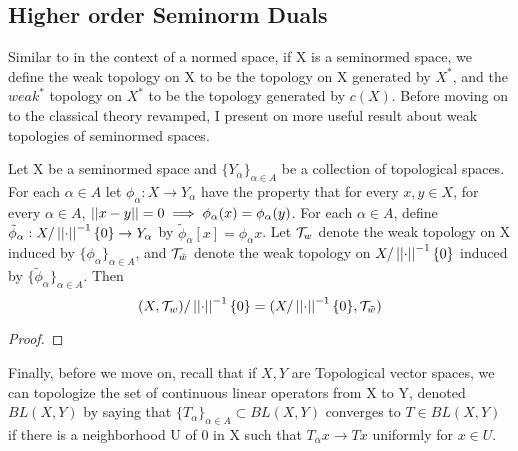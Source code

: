 \subsection{Higher order Seminorm Duals}





 Similar to in the context of a normed space, if X is a seminormed space, we define the weak topology on X to be the topology on X generated by $X^*$, and the $weak^*$ topology on $X^*$ to be the topology generated by $c(X)$.
Before moving on to the classical theory revamped, I present on more useful result about weak topologies of seminormed spaces. 
\begin{prop}
    \label{prop:weakquotients}
    Let X be a seminormed space and $\{Y_\alpha\}_{\alpha \in A}$ be a collection of topological spaces. For each $\alpha \in A$ let $\phi_\alpha:X \to Y_\alpha$ have the property that for every $x,y \in X$, for every $\alpha \in A$, $\left|\left| x-y \right|\right|=0 \implies \phi_\alpha(x)=\phi_\alpha(y)$. 
    For each $\alpha \in A$, define $\tilde{\phi}_\alpha:X/\left|\left| \cdot \right|\right|^{-1}\{0\} \to Y_\alpha$ by
    $\tilde{\phi}_{\alpha}[x] = \phi_\alpha x$. Let $\mathcal{T}_w$ denote the weak topology on X induced by $\{\phi_\alpha\}_{\alpha \in A}$, and $\mathcal{T}_{\tilde{w}}$ denote the weak topology on $X/\left|\left| \cdot \right|\right|^{-1}\{0\}$ induced by $\{\tilde{\phi}_{\alpha}\}_{\alpha \in A}$. Then 
    \begin{equation}
        (X,\mathcal{T}_w)/\left|\left| \cdot \right|\right|^{-1}\{0\} = (X/\left|\left| \cdot \right|\right|^{-1}\{0\}, \mathcal{T}_{\tilde{w}})
    \end{equation}
    \begin{proof}
    \end{proof} 
\end{prop} 


Finally, before we move on, recall that if $X,Y$ are Topological vector spaces, we can topologize the set of continuous linear operators from X to Y, denoted $BL(X,Y)$ by saying that $\{T_\alpha\}_{\alpha \in A} \subset BL(X,Y)$ converges to $T \in BL(X,Y)$ if there is a neighborhood U of 0 in X such that $T_{\alpha}x \to Tx$ uniformly for $x \in U$. 
